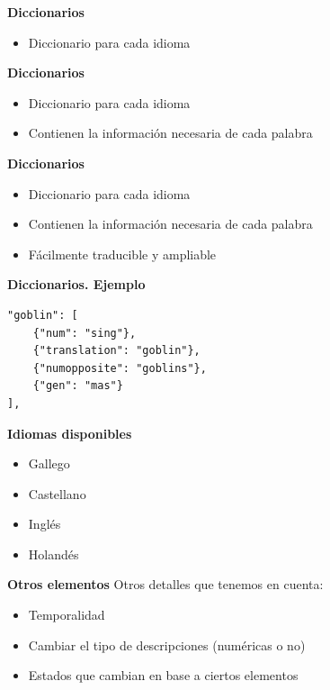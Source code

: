\begin{tframe}{\textbf{Diccionarios}}
	\begin{itemize}
		\item<+-| alert@+> Diccionario para cada idioma
	\end{itemize}
\end{tframe}

\begin{tframe}{\textbf{Diccionarios}}
	\begin{itemize}
		\item Diccionario para cada idioma
		\item<+-| alert@+> Contienen la información necesaria de cada palabra
	\end{itemize}
\end{tframe}

\begin{tframe}{\textbf{Diccionarios}}
	\begin{itemize}
		\item Diccionario para cada idioma
		\item Contienen la información necesaria de cada palabra
		\item<+-| alert@+> Fácilmente traducible y ampliable
	\end{itemize}
\end{tframe}

\begin{frame}[t, fragile]{\textbf{Diccionarios. Ejemplo}}
	\begin{Verbatim}
"goblin": [
    {"num": "sing"},
    {"translation": "goblin"},
    {"numopposite": "goblins"},
    {"gen": "mas"}
],
	\end{Verbatim}
\end{frame}


\begin{frame}[t, fragile]{\textbf{Idiomas disponibles}}
	\begin{itemize}
		\item Gallego
		\item Castellano
		\item Inglés
		\item Holandés
	\end{itemize}
\end{frame}


\begin{tframe}{\textbf{Otros elementos}}
	Otros detalles que tenemos en cuenta:
	\begin{itemize}
		\item Temporalidad
		\item Cambiar el tipo de descripciones (numéricas o no)
		\item Estados que cambian en base a ciertos elementos
	\end{itemize}
\end{tframe}

